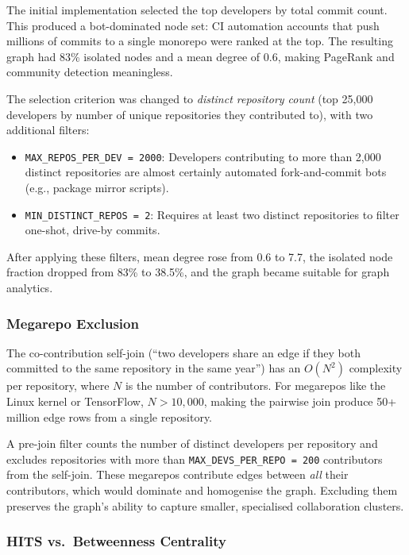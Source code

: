 \documentclass[conference]{IEEEtran}
\begin{document}
The initial implementation selected the top developers by total commit
count. This produced a bot-dominated node set: CI automation accounts
that push millions of commits to a single monorepo were ranked at the top.
The resulting graph had 83\% isolated nodes and a mean degree of 0.6,
making PageRank and community detection meaningless.

The selection criterion was changed to \emph{distinct repository count}
(top 25,000 developers by number of unique repositories they contributed
to), with two additional filters:

\begin{itemize}
  \item \texttt{MAX\_REPOS\_PER\_DEV = 2000}: Developers contributing to
        more than 2,000 distinct repositories are almost certainly automated
        fork-and-commit bots (e.g., package mirror scripts).
  \item \texttt{MIN\_DISTINCT\_REPOS = 2}: Requires at least two distinct
        repositories to filter one-shot, drive-by commits.
\end{itemize}

After applying these filters, mean degree rose from 0.6 to 7.7, the
isolated node fraction dropped from 83\% to 38.5\%, and the graph became
suitable for graph analytics.

\subsubsection{Megarepo Exclusion}

The co-contribution self-join (``two developers share an edge if they both
committed to the same repository in the same year'') has an $O(N^2)$
complexity per repository, where $N$ is the number of contributors. For
megarepos like the Linux kernel or TensorFlow, $N > 10,000$, making the
pairwise join produce 50+ million edge rows from a single repository.

A pre-join filter counts the number of distinct developers per repository
and excludes repositories with more than \texttt{MAX\_DEVS\_PER\_REPO = 200}
contributors from the self-join. These megarepos contribute edges between
\emph{all} their contributors, which would dominate and homogenise the
graph. Excluding them preserves the graph's ability to capture smaller,
specialised collaboration clusters.

\subsubsection{HITS vs.\ Betweenness Centrality}
\end{document}
